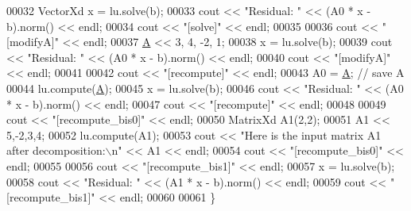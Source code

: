 \begin{DoxyCode}
00032   VectorXd x = lu.solve(b);
00033   cout << \textcolor{stringliteral}{"Residual: "} << (A0 * x - b).norm() << endl;
00034 cout << \textcolor{stringliteral}{"[solve]"} << endl;
00035 
00036 cout << \textcolor{stringliteral}{"[modifyA]"} << endl;
00037   \hyperlink{group___core___module_class_eigen_1_1_matrix}{A} << 3, 4, -2, 1;
00038   x = lu.solve(b);
00039   cout << \textcolor{stringliteral}{"Residual: "} << (A0 * x - b).norm() << endl;
00040 cout << \textcolor{stringliteral}{"[modifyA]"} << endl;
00041 
00042 cout << \textcolor{stringliteral}{"[recompute]"} << endl;
00043   A0 = \hyperlink{group___core___module_class_eigen_1_1_matrix}{A}; \textcolor{comment}{// save A}
00044   lu.compute(\hyperlink{group___core___module_class_eigen_1_1_matrix}{A});
00045   x = lu.solve(b);
00046   cout << \textcolor{stringliteral}{"Residual: "} << (A0 * x - b).norm() << endl;
00047 cout << \textcolor{stringliteral}{"[recompute]"} << endl;
00048 
00049 cout << \textcolor{stringliteral}{"[recompute\_bis0]"} << endl;
00050   MatrixXd A1(2,2);
00051   A1 << 5,-2,3,4;
00052   lu.compute(A1);
00053   cout << \textcolor{stringliteral}{"Here is the input matrix A1 after decomposition:\(\backslash\)n"} << A1 << endl;
00054 cout << \textcolor{stringliteral}{"[recompute\_bis0]"} << endl;
00055 
00056 cout << \textcolor{stringliteral}{"[recompute\_bis1]"} << endl;
00057   x = lu.solve(b);
00058   cout << \textcolor{stringliteral}{"Residual: "} << (A1 * x - b).norm() << endl;
00059 cout << \textcolor{stringliteral}{"[recompute\_bis1]"} << endl;
00060 
00061 \}
\end{DoxyCode}
